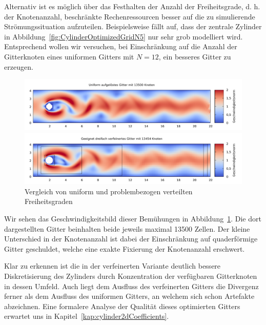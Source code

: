 Alternativ ist es möglich über das Festhalten der Anzahl der Freiheitsgrade, d. h. der Knotenanzahl, beschränkte Rechenressourcen besser auf die zu simulierende Strömungssituation aufzuteilen. Beispielsweise fällt auf, dass der zentrale Zylinder in Abbildung~\ref{fig:CylinderOptimizedGridN5} nur sehr grob modelliert wird. Entsprechend wollen wir versuchen, bei Einschränkung auf die Anzahl der Gitterknoten eines uniformen Gitters mit \(N=12\), ein besseres Gitter zu erzeugen.

\begin{figure}[H]
\begin{adjustbox}{center}
\includegraphics[width=1.2\textwidth]{img/static/cylinder2d_unrefined_n12_re100_16s.pdf}
\end{adjustbox}
\begin{adjustbox}{center}
\includegraphics[width=1.2\textwidth]{img/static/cylinder2d_optimized_refinement_n5_re100_16s.pdf}
\end{adjustbox}
\caption{Vergleich von uniform und problembezogen verteilten Freiheitsgraden}
\label{fig:CylinderOptimizedGridComparison}
\end{figure}

\newpage
Wir sehen das Geschwindigkeitsbild dieser Bemühungen in Abbildung~\ref{fig:CylinderOptimizedGridComparison}. Die dort dargestellten Gitter beinhalten beide jeweils maximal 13500 Zellen. Der kleine Unterschied in der Knotenanzahl ist dabei der Einschränkung auf quaderförmige Gitter geschuldet, welche eine exakte Fixierung der Knotenanzahl erschwert.

Klar zu erkennen ist die in der verfeinerten Variante deutlich bessere Diskretisierung des Zylinders durch Konzentration der verfügbaren Gitterknoten in dessen Umfeld. Auch liegt dem Ausfluss des verfeinerten Gitters die Divergenz ferner als dem Ausfluss des uniformen Gitters, an welchem sich schon Artefakte abzeichnen. Eine formalere Analyse der Qualität dieses optimierten Gitters erwartet uns in Kapitel~\ref{kap:cylinder2dCoefficients}.

